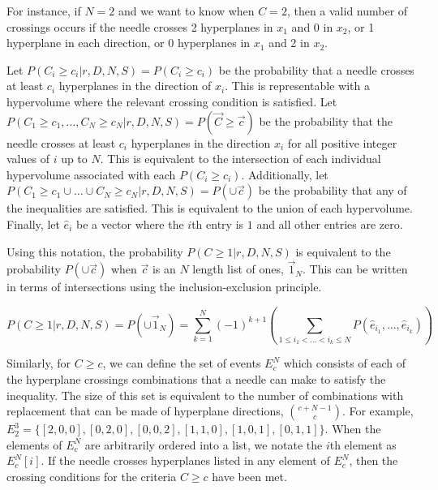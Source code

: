 \documentclass{article}
\begin{document}
For instance, if $N=2$ and we want to know when $C=2$, then a valid number of crossings occurs if the
needle crosses 2 hyperplanes in $x_1$ and 0 in $x_2$, or 1 hyperplane in each direction, or 0 hyperplanes
in $x_1$ and 2 in $x_2$.

Let $P(C_i\ge c_i|r,D,N,S)=P(C_i\ge c_i)$ be the probability that a needle crosses at least $c_i$ hyperplanes in the direction of
$x_i$. This is representable with a hypervolume where the relevant crossing condition is satisfied.
Let $P(C_1\ge c_1 , \hdots , C_N\ge c_N|r,D,N,S)=P(\vec{C}\ge \vec{c})$ be the probability that the needle crosses at
least $c_i$ hyperplanes in the direction $x_i$ for all positive integer values of $i$ up to $N$. This is equivalent
to the intersection of each individual hypervolume associated with each $P(C_i\ge c_i)$. Additionally,
let $P(C_1\ge c_1 \cup \hdots \cup C_N\ge c_N|r,D,N,S)=P(\cup\vec{c})$ be the probability that any of the
inequalities are satisfied. This is equivalent to the union of each hypervolume. Finally, let $\hat e_i$
be a vector where the $i$th entry is $1$ and all other entries are zero.

Using this notation, the probability $P(C\ge 1|r, D, N, S)$ is equivalent to the probability $P(\cup\vec{c})$
when $\vec{c}$ is an $N$ length list of ones, $\vec{1}_N$. This can be written in terms of intersections using
the inclusion-exclusion principle.

\begin{equation}
	P(C\ge 1|r, D, N, S) = P(\cup\vec{1}_N) = \sum_{k=1}^N (-1)^{k+1}\left(\sum_{1\le i_1 < \hdots < i_k \le N}P(\hat{e}_{i_1}, \hdots, \hat{e}_{i_k})\right)
\end{equation}

Similarly, for $C\ge c$, we can define the set of events $E_c^N$ which consists of each of the hyperplane
crossings combinations that a needle can make to satisfy the inequality. The size of this set is equivalent
to the number of combinations with replacement that can be made of hyperplane directions, ${c+N-1} \choose c$.
For example, $E_2^3=\{[2,0,0], [0,2,0], [0,0,2], [1,1,0], [1,0,1], [0,1,1]\}$. When the elements of $E_c^N$
are arbitrarily ordered into a list, we notate the $i$th element as $E_c^N[i]$. If the needle crosses
hyperplanes listed in any element of $E_c^N$, then the crossing conditions for the criteria $C \ge c$ have
been met.
\end{document}
